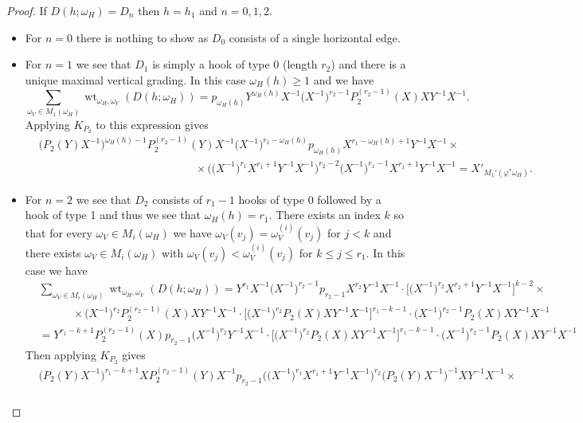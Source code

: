 \documentclass{amsart}
\newcommand{\wt}{\operatorname{wt}}
\begin{document}
\begin{proof}
  If $D(h;\omega_H)=D_n$ then $h=h_1$ and $n=0,1,2$.  
  \begin{itemize}
   \item For $n=0$ there is nothing to show as $D_0$ consists of a single horizontal edge.  
   \item For $n=1$ we see that $D_1$ is simply a hook of type 0 (length $r_2$) and there is a unique maximal vertical grading.  In this case $\omega_H(h)\ge1$ and we have
   \[\sum\limits_{\omega_V\in M_1(\omega_H)}\wt_{\omega_H,\omega_V}(D(h;\omega_H))=p_{\omega_H(h)}Y^{\omega_H(h)}X^{-1}\big(X^{-1}\big)^{r_2-1}P_2^{(r_2-1)}(X)XY^{-1}X^{-1}.\]
   Applying $K_{P_2}$ to this expression gives
   \begin{align*}
    &\Big(P_2(Y)X^{-1}\Big)^{\omega_H(h)-1}P_2^{(r_2-1)}(Y)X^{-1}\big(X^{-1}\big)^{r_1-\omega_H(h)}p_{\omega_H(h)}X^{r_1-\omega_H(h)+1}Y^{-1}X^{-1}\times\\
    &\quad\quad\quad\quad\quad\quad\quad\quad\quad\quad\quad\quad\quad\quad\times\bigg(\big(X^{-1}\big)^{r_1}X^{r_1+1}Y^{-1}X^{-1}\bigg)^{r_2-2}\big(X^{-1}\big)^{r_1-1}X^{r_1+1}Y^{-1}X^{-1}=X'_{M_1'(\varphi^* \omega_H)}.
   \end{align*}
   \item For $n=2$ we see that $D_2$ consists of $r_1-1$ hooks of type 0 followed by a hook of type 1 and thus we see that $\omega_H(h)=r_1$.  There exists an index $k$ so that for every $\omega_V\in M_i(\omega_H)$ we have $\omega_V(v_j)=\omega_V^{(i)}(v_j)$ for $j<k$ and there exists $\omega_V\in M_i(\omega_H)$ with $\omega_V(v_j)<\omega_V^{(i)}(v_j)$ for $k\le j\le r_1$.  In this case we have
  \begin{align*}
   &\sum\limits_{\omega_V\in M_i(\omega_H)}\wt_{\omega_H,\omega_V}(D(h;\omega_H))
   =Y^{r_1}X^{-1}\big(X^{-1}\big)^{r_2-1}p_{r_2-1}X^{r_2}Y^{-1}X^{-1}\cdot\Big[\big(X^{-1}\big)^{r_2}X^{r_2+1}Y^{-1}X^{-1}\Big]^{k-2}\times\\
   &\quad\quad\quad\times\big(X^{-1}\big)^{r_2}P_2^{(r_2-1)}(X)XY^{-1}X^{-1}\cdot\Big[\big(X^{-1}\big)^{r_2}P_2(X)XY^{-1}X^{-1}\Big]^{r_1-k-1}\cdot\big(X^{-1}\big)^{r_2-1}P_2(X)XY^{-1}X^{-1}\\
   &=Y^{r_1-k+1}P_2^{(r_2-1)}(X)p_{r_2-1}\big(X^{-1}\big)^{r_2}Y^{-1}X^{-1}\cdot\Big[\big(X^{-1}\big)^{r_2}P_2(X)XY^{-1}X^{-1}\Big]^{r_1-k-1}\cdot\big(X^{-1}\big)^{r_2-1}P_2(X)XY^{-1}X^{-1}
  \end{align*}
  Then applying $K_{P_2}$ gives
  \begin{align*}
   &\big(P_2(Y)X^{-1}\big)^{r_1-k+1}XP_2^{(r_2-1)}(Y)X^{-1}p_{r_2-1}\bigg(\big(X^{-1}\big)^{r_1}X^{r_1+1}Y^{-1}X^{-1}\bigg)^{r_2}\big(P_2(Y)X^{-1}\big)^{-1}XY^{-1}X^{-1}\times\\

\end{align*}
\end{itemize}
\end{proof}
\end{document}
